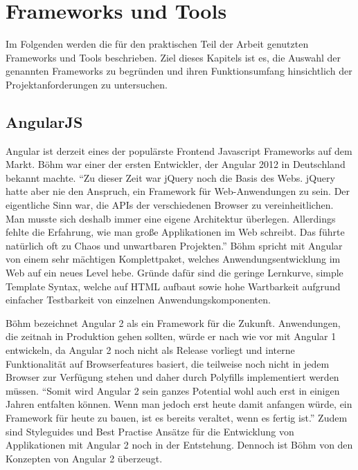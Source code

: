 
\chapter{Frameworks und Tools}
\label{chap:frameworks}

Im Folgenden werden die für den praktischen Teil der Arbeit genutzten Frameworks und Tools beschrieben.
Ziel dieses Kapitels ist es, die Auswahl der genannten Frameworks zu begründen und
ihren Funktionsumfang hinsichtlich der Projektanforderungen zu untersuchen.

\section{AngularJS}

Angular ist derzeit eines der populärste Frontend Javascript Frameworks auf dem Markt.
Böhm war einer der ersten Entwickler, der Angular 2012 in Deutschland bekannt machte.
``Zu dieser Zeit war jQuery noch die Basis des Webs. jQuery hatte aber nie den Anspruch, ein Framework für Web-Anwendungen zu sein. Der eigentliche Sinn war, die APIs der verschiedenen Browser zu vereinheitlichen.
Man musste sich deshalb immer eine eigene Architektur überlegen. Allerdings fehlte die Erfahrung, wie man große Applikationen im Web schreibt. Das führte natürlich oft zu Chaos und unwartbaren Projekten.''\cite{Angu68:online}
Böhm spricht mit Angular von einem sehr mächtigen Komplettpaket, welches Anwendungsentwicklung im Web auf ein neues Level hebe.
Gründe dafür sind die geringe Lernkurve, simple Template Syntax,
welche auf \ac{HTML} aufbaut sowie hohe Wartbarkeit aufgrund einfacher Testbarkeit von einzelnen Anwendungskomponenten.

Böhm bezeichnet Angular 2 als ein Framework für die Zukunft.
Anwendungen, die zeitnah in Produktion gehen sollten, würde er nach wie vor mit Angular 1 entwickeln,
da Angular 2 noch nicht als Release vorliegt und interne Funktionalität auf Browserfeatures basiert,
die teilweise noch nicht in jedem Browser zur Verfügung stehen und daher durch Polyfills implementiert werden müssen.
``Somit wird Angular 2 sein ganzes Potential wohl auch erst in einigen Jahren entfalten können.
Wenn man jedoch erst heute damit anfangen würde, ein Framework für heute zu bauen,
ist es bereits veraltet, wenn es fertig ist.''\cite{Angu68:online}
Zudem sind Styleguides und Best Practise Ansätze für die Entwicklung von Applikationen mit Angular 2
noch in der Entstehung.
Dennoch ist Böhm von den Konzepten von Angular 2 überzeugt.


